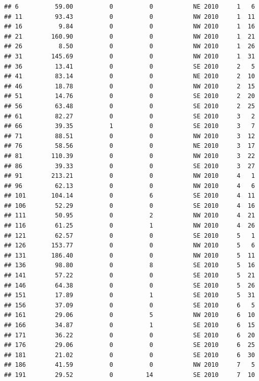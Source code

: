 \documentclass[
]{article}
\begin{document}
\begin{verbatim}
## 6          59.00          0          0           NE 2010     1   6
## 11         93.43          0          0           NW 2010     1  11
## 16          9.84          0          0           NW 2010     1  16
## 21        160.90          0          0           NW 2010     1  21
## 26          8.50          0          0           NW 2010     1  26
## 31        145.69          0          0           NW 2010     1  31
## 36         13.41          0          0           SE 2010     2   5
## 41         83.14          0          0           NE 2010     2  10
## 46         18.78          0          0           NW 2010     2  15
## 51         14.76          0          0           SE 2010     2  20
## 56         63.48          0          0           SE 2010     2  25
## 61         82.27          0          0           SE 2010     3   2
## 66         39.35          1          0           SE 2010     3   7
## 71         88.51          0          0           NW 2010     3  12
## 76         58.56          0          0           NE 2010     3  17
## 81        110.39          0          0           NW 2010     3  22
## 86         39.33          0          0           SE 2010     3  27
## 91        213.21          0          0           NW 2010     4   1
## 96         62.13          0          0           NW 2010     4   6
## 101       104.14          0          6           SE 2010     4  11
## 106        52.29          0          0           SE 2010     4  16
## 111        50.95          0          2           NW 2010     4  21
## 116        61.25          0          1           NW 2010     4  26
## 121        62.57          0          0           SE 2010     5   1
## 126       153.77          0          0           NW 2010     5   6
## 131       186.40          0          0           NW 2010     5  11
## 136        98.80          0          8           SE 2010     5  16
## 141        57.22          0          0           SE 2010     5  21
## 146        64.38          0          0           SE 2010     5  26
## 151        17.89          0          1           SE 2010     5  31
## 156        37.09          0          0           SE 2010     6   5
## 161        29.06          0          5           NW 2010     6  10
## 166        34.87          0          1           SE 2010     6  15
## 171        36.22          0          0           SE 2010     6  20
## 176        29.06          0          0           SE 2010     6  25
## 181        21.02          0          0           SE 2010     6  30
## 186        41.59          0          0           NW 2010     7   5
## 191        29.52          0         14           SE 2010     7  10

\end{verbatim}
\end{document}
